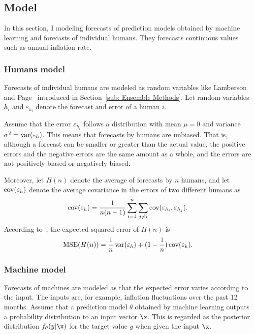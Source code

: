 \documentclass[../main.tex]{subfiles}
\begin{document}
\subsection{Model}
\label{sub: Model}

In this section, I modeling forecasts of prediction models obtained by machine learning and forecasts of individual humans.
They forecasts continuous values such as annual inflation rate.

\subsubsection{Humans model}
\label{ssub: Humans model}

Forecasts of individual humans are modeled as random variables like Lamberson and Page~\cite{Lamberson2012} introduced in Section~\ref{sub: Ensemble Methods}.
Let random variables $h_i$ and $\varepsilon_{h_i}$ denote the forecast and error of a human $i$.

Assume that the error $\varepsilon_{h_i}$ follows a distribution with mean $\mu = 0$ and variance $\sigma^2 = \operatorname{var}(\varepsilon_h)$.
This means that forecasts by humans are unbiased.
That is, although a forecast can be smaller or greater than the actual value, the positive errors and the negative errors are the same amount as a whole, and the errors are not positively biased or negatively biased.

Moreover, let $H(n)$ denote the average of forecasts by $n$ humans, and let $\operatorname{cov}(\varepsilon_h)$ denote the average covariance in the errors of two different humans as
\begin{equation}
  \operatorname{cov}(\varepsilon_h) = \frac{1}{n(n - 1)}\sum_{i=1}^n\sum_{j \neq i}\operatorname{cov}(\varepsilon_{h_i}, \varepsilon_{h_j}).
  \label{eq: covh}
\end{equation}
According to~\cite{Ueda1996}, the expected squared error of $H(n)$ is
\begin{equation}
  \operatorname{MSE}(H(n)) = \frac{1}{n}\operatorname{var}(\varepsilon_h) + (1 - \frac{1}{n})\operatorname{cov}(\varepsilon_h).
  \label{eq: expected squared error of humans}
\end{equation}

\subsubsection{Machine model}
\label{ssub: Machine model}

Forecasts of machines are modeled as that the expected error varies according to the input.
The inputs are, for example, inflation fluctuations over the past 12 months.
Assume that a prediction model $\theta$ obtained by machine learning outputs a probability distribution to an input vector $\x$.
This is regarded as the posterior distribution $f_\theta(y|\x)$ for the target value $y$ when given the input $\x$.
\end{document}
